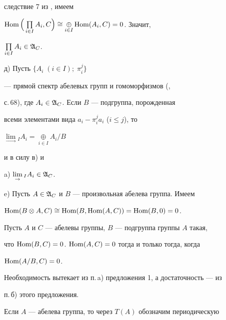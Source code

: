 \begin{pf}
следствие 7 из \cite{2}, имеем 


$\Hom\Big(\prod\limits_{i\in I}A_i,C\Big)\cong 


\underset{i\in I}{\oplus}{}\Hom(A_i,C)=0$. Значит, 


$\prod\limits_{i\in I}A_i\in\frak A_C$. 


 


д) Пусть $\{A_i\;(i\in I);\;\pi^j_i\}$ 


--- прямой спектр абелевых групп и гомоморфизмов (\cite{3}, 


с.\,68), где $A_i\in\frak A_C$. Если $B$ --- подгруппа, порожденная 


всеми элементами вида $a_i-\pi^j_i a_i$ ($i\le j$), то 


$\lim\limits_{\to}{}_I A_i=\underset{i\in I}{\oplus}{}A_i/B$ 


и в силу в) и 


a)\; $\lim\limits_{\to}{}_I A_i\in\frak A_C$. 


 


e) Пусть $A\in\frak A_C$ и $B$ --- произвольная абелева группа. Имеем 


$\Hom(B\otimes A,C)\cong\linebreak \Hom(B,\Hom(A,C))=\Hom(B,0)=0$. 


\end{pf} 


 


\begin{cor} 


Пусть $A$ и $C$ --- абелевы группы, $B$ --- подгруппа группы $A$ такая, 


что $\operatorname{Hom}(B,C)=0$.\; $\operatorname{Hom}(A,C)=0$ тогда и только тогда, когда 


$\operatorname{Hom}(A/B,C)=0$. 


\end{cor} 


 


\begin{pf} 


Необходимость вытекает из п.\,a) предложения 1, а достаточность --- из 


п.\,б) этого предложения. 


\end{pf} 


 


Если $A$ --- абелева группа, то через $T(A)$ обозначим периодическую 


